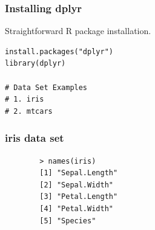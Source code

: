 \documentclass{beamer}
\begin{document}
\begin{frame}[fragile]
\frametitle{Installing dplyr}
Straightforward R package installation.
\begin{framed}
\begin{verbatim}
install.packages("dplyr")
library(dplyr)

# Data Set Examples
# 1. iris
# 2. mtcars

\end{verbatim}
\end{framed}
\end{frame}
	
	\begin{frame}[fragile]
		\frametitle{iris data set}
\begin{framed}
		\begin{verbatim}
		> names(iris)
		[1] "Sepal.Length"
		[2] "Sepal.Width" 
		[3] "Petal.Length"
		[4] "Petal.Width" 
		[5] "Species"    
		\end{verbatim}
\end{framed}
	\end{frame}
\end{document}
